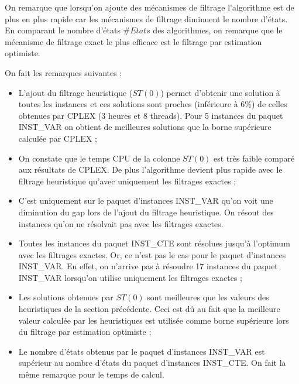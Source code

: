 On remarque que lorsqu'on ajoute des mécanismes de filtrage l'algorithme est de plus en plus rapide car les mécanismes de filtrage diminuent le nombre d'états. En comparant le nombre d'états $\#Etats$ des algorithmes, on remarque que le mécanisme de filtrage exact le plus efficace est le filtrage par estimation optimiste. 

On fait les remarques suivantes :
\begin{itemize}[label=$\square$]
	
	\item L'ajout du filtrage heuristique ($ST(0)$) permet d'obtenir une solution à toutes les instances et ces solutions sont proches (inférieure à 6\%) de celles obtenues par CPLEX (3 heures et 8 threads). Pour 5 instances du paquet INST\_VAR on obtient de meilleures solutions que la borne supérieure calculée par CPLEX ;
	\item On constate que le temps CPU de la colonne $ST(0)$ est très faible comparé aux résultats de CPLEX. De plus l'algorithme devient plus rapide avec le filtrage heuristique qu'avec uniquement les filtrages exactes ;
	\item  C'est uniquement sur le paquet d'instances INST\_VAR qu'on voit une diminution du gap lors de l'ajout du filtrage heuristique. On résout des instances qu'on ne résolvait pas avec les filtrages exactes. 
	\item Toutes les instances du paquet INST\_CTE sont résolues jusqu'à l'optimum avec les filtrages exactes. Or, ce n'est pas le cas pour le paquet d'instances INST\_VAR. En effet, on n'arrive pas à résoudre 17 instances du paquet INST\_VAR lorsqu'on utilise uniquement les filtrages exactes ;
	\item Les solutions obtenues par $ST(0)$ sont meilleures que les valeurs des heuristiques de la section précédente. Ceci est dû au fait que la meilleure valeur calculée par les heuristiques est utilisée comme borne supérieure lors du filtrage par estimation optimiste ;
	\item Le nombre d'états obtenus par le paquet d'instances INST\_VAR est supérieur au nombre d'états du paquet d'instances INST\_CTE. On fait la même remarque pour le temps de calcul.
	
\end{itemize}

